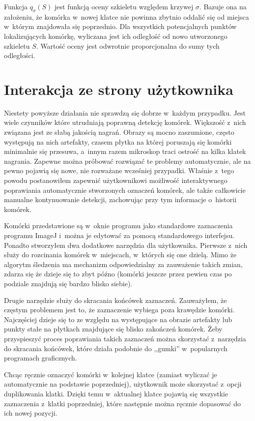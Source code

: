 \documentclass[declaration,shortabstract,mgr]{iithesis}
\begin{document}
Funkcja $q_\sigma(S)$ jest funkcją oceny szkieletu względem krzywej $\sigma$. Bazuje ona na założeniu, że komórka w~nowej klatce nie powinna zbytnio oddalić się od miejsca w~którym znajdowała się poprzednio.
Dla wszystkich potencjalnych punktów lokalizujących komórkę, wyliczana jest ich odległość od nowo utworzonego szkieletu $S$. Wartość oceny jest odwrotnie proporcjonalna do sumy tych odległości.

\section{Interakcja ze strony użytkownika}

Niestety powyższe działania nie sprawdzą się dobrze w~każdym przypadku.
Jest wiele czynników które utrudniają poprawną detekcję komórek.
Większość z~nich związana jest ze słabą jakością nagrań.
Obrazy są mocno zaszumione, często występują na nich artefakty, czasem płytka na której poruszają się komórki minimalnie się przesuwa, a~innym razem mikroskop traci ostrość na kilka klatek nagrania.
Zapewne można próbować rozwiązać te problemy automatycznie, ale na pewno pojawią się nowe, nie rozważane wcześniej przypadki.
Właśnie z~tego powodu postanowiłem zapewnić użytkownikowi możliwość interaktywnego poprawiania automatycznie stworzonych oznaczeń komórek, ale także całkowicie manualne kontynuowanie detekcji, zachowując przy tym informacje o~historii komórek.

Komórki przedstawione są w~oknie programu jako standardowe zaznaczenia programu ImageJ i~można je edytować za pomocą standardowego interfejsu.
Ponadto stworzyłem dwa dodatkowe narzędzia dla użytkownika.
Pierwsze z~nich służy do rozcinania komórek w~miejscach, w~których się one dzielą.
Mimo że algorytm śledzenia ma mechanizm odpowiedzialny za zauważenie takich zmian, zdarza się że dzieje się to zbyt późno (komórki jeszcze przez pewien czas po podziale znajdują się bardzo blisko siebie).

Drugie narzędzie służy do skracania końcówek zaznaczeń.
Zauważyłem, że częstym problemem jest to, że zaznaczenie wybiega poza krawędzie komórki.
Najczęściej dzieje się to ze względu na występujące na obrazie artefakty lub punkty stałe na płytkach znajdujące się blisko zakończeń komórek.
Żeby przyspieszyć proces poprawiania takich zaznaczeń można skorzystać z~narzędzia do skracania końcówek, które działa podobnie do ,,gumki'' w~popularnych programach graficznych.

Chcąc ręcznie oznaczyć komórki w~kolejnej klatce (zamiast wyliczać je automatycznie na podstawie poprzedniej), użytkownik może skorzystać z~opcji duplikowania klatki. Dzięki temu w~aktualnej klatce pojawią się wszystkie zaznaczenia z~klatki poprzedniej, które następnie można ręcznie dopasować do ich nowej pozycji.
\end{document}

